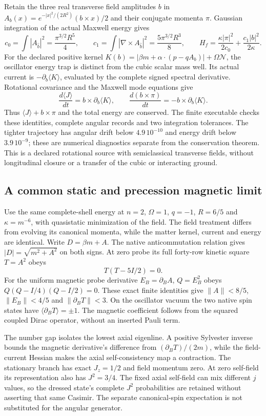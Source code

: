Retain the three real transverse field amplitudes $b$ in
$A_b(x)=e^{-|x|^2/(2R^2)}(b\times x)/2$ and their conjugate momenta $\pi$.
Gaussian integration of the actual Maxwell energy gives
\[
 c_0=\int |A_{\hat b}|^2=\frac{\pi^{3/2}R^5}{4},\qquad
 c_1=\int |\nabla\times A_{\hat b}|^2=
       \frac{5\pi^{3/2}R^3}{8},\qquad
 H_f=\frac{\kappa|\pi|^2}{2c_0}+\frac{c_1|b|^2}{2\kappa}.
\]
For the declared positive kernel
$K(b)=|\beta m+\alpha\cdot(p-qA_b)|+\Omega\mathcal N$,
the oscillator energy trap is distinct from the cubic scalar mass well.
Its actual current is $-\partial_b\langle K\rangle$, evaluated by the
complete signed spectral derivative. Rotational covariance and the
Maxwell mode equations give
\[
 \frac{d\langle J\rangle}{dt}
       =b\times\partial_b\langle K\rangle,
 \qquad
 \frac{d(b\times\pi)}{dt}
       =-b\times\partial_b\langle K\rangle.
\]
Thus $\langle J\rangle+b\times\pi$ and the total energy are conserved.
The finite executable checks these identities, complete angular records
and two integration tolerances. The tighter trajectory has angular drift
below $4.9\,10^{-10}$ and energy drift below $3.9\,10^{-9}$; these are
numerical diagnostics separate from the conservation theorem. This is a
declared rotational source with semiclassical transverse fields, without
longitudinal closure or a transfer of the cubic or interacting ground.

\subsection{A common static and precession magnetic limit}

Use the same complete-shell energy at $n=2$, $\Omega=1$, $q=-1$,
$R=6/5$ and $\kappa=m^{-6}$, with quasistatic minimization of the field.
The field treatment differs from evolving its canonical momenta, while
the matter kernel, current and energy are identical. Write
$D=\beta m+A$. The native anticommutation relation gives
$|D|=\sqrt{m^2+A^2}$ on both signs. At zero probe its full forty-row
kinetic square $T=A^2$ obeys
\[
 T(T-5I/2)=0.
\]
For the uniform magnetic probe derivative $E_B=\partial_B A$,
$Q=E_B^2$ obeys $Q(Q-I/4)(Q-I/2)=0$. These exact finite identities give
$\|A\|<8/5$, $\|E_B\|<4/5$ and $\|\partial_B T\|<3$.
On the oscillator vacuum the two native spin states have
$\langle\partial_B T\rangle=\pm1$. The magnetic coefficient follows
from the squared coupled Dirac operator, without an inserted Pauli term.

The number gap isolates the lowest axial eigenline. A positive Sylvester
inverse bounds the magnetic derivative's difference from
$(\partial_B T)/(2m)$, while the field-current Hessian makes the axial
self-consistency map a contraction. The stationary branch has exact
$J_z=1/2$ and field momentum zero. At zero self-field its representation
also has $J^2=3/4$. The fixed axial self-field can mix different $j$
values, so the dressed state's complete $J^2$ probabilities are retained
without asserting that same Casimir. The separate canonical-spin
expectation is not substituted for the angular generator.

